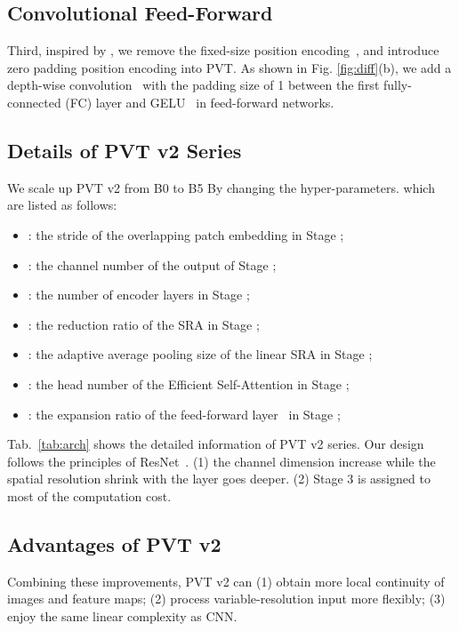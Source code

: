 \documentclass[10pt,twocolumn,letterpaper]{article}
\begin{document}
	\subsection{Convolutional Feed-Forward} 
	\label{sec:c-ffn}
	Third, inspired by \cite{zeropadding,cpvt,localvit}, we remove the fixed-size position encoding~\cite{dosovitskiy2020image}, and introduce zero padding position encoding into PVT.
	As shown in Fig. \ref{fig:diff}(b), we add a  depth-wise convolution~\cite{howard2017mobilenets} with the padding size of 1 between the first fully-connected (FC) layer and GELU~\cite{gelu} in feed-forward networks.
	
	
	\subsection{Details of PVT v2 Series}
	We scale up PVT v2 from B0 to B5 By changing the hyper-parameters.
which are listed as follows:
	\begin{itemize}
		\item : the stride of the overlapping patch embedding in Stage ;
		\item : the channel number of the output of Stage ;
		\item : the number of encoder layers in Stage ;
		\item : the reduction ratio of the SRA in Stage ;
		\item : the adaptive average pooling size of the linear SRA in Stage ;
		\item : the head number of the Efficient Self-Attention in Stage ;
		\item : the expansion ratio of the feed-forward layer~\cite{vaswani2017attention} in Stage ;
	\end{itemize}
	
	Tab.~\ref{tab:arch} shows the detailed information of PVT v2 series. Our design follows the principles of ResNet~\cite{he2016deep}. (1) the channel dimension increase while the spatial resolution shrink with the layer goes deeper. (2) Stage 3 is assigned to most of the computation cost.
	
	\subsection{Advantages of PVT v2} 
	Combining these improvements, PVT v2 can (1) obtain more local continuity of images and feature maps; (2) process variable-resolution input more flexibly; (3) enjoy the same linear complexity as CNN.
	
\end{document}
